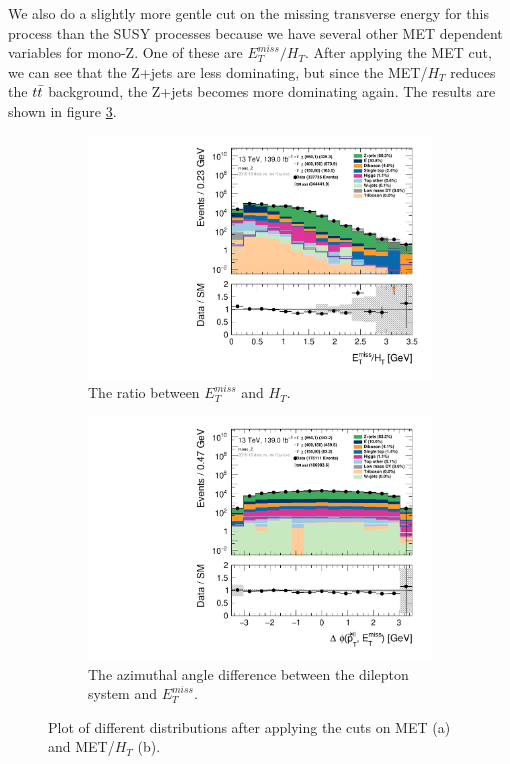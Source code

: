 We also do a slightly more gentle cut on the missing transverse energy for this process than the SUSY processes because we have several other MET dependent variables for mono-Z. One of these are $E_T^{miss}/H_T$. After applying the MET cut, we can see that the Z+jets are less dominating, but since the MET/$H_T$ reduces the $t\Bar{t}$ background, the Z+jets becomes more dominating again. The results are shown in figure \ref{fig:stepsDM2}.

\begin{figure}[H]
    \centering
    \begin{subfigure}[t!]{0.49\textwidth}
        \includegraphics[width=\textwidth]{Figures/MonoZcuts/hist1d_met_HT_mono_Z.pdf}
    \caption{The ratio between $E_T^{miss}$ and $H_T$.}
    \label{fig:metHTDM}
    \end{subfigure}
    \begin{subfigure}[t!]{0.49\textwidth}
        \includegraphics[width=\textwidth]{Figures/MonoZcuts/hist1d_deltaPhi_mono_Z.pdf}
    \caption{The azimuthal angle difference between the dilepton system and $E_T^{miss}$.}
    \label{fig:delphiDM}
    \end{subfigure}
    \caption{Plot of different distributions after applying the cuts on MET (a) and MET/$H_T$ (b).}
    \label{fig:stepsDM2}
\end{figure}


